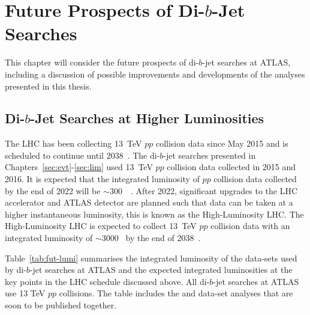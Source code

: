 \chapter{Future Prospects of Di-$b$-Jet Searches}
\label{sec:fut}

This chapter will consider the future prospects of di-$b$-jet searches at ATLAS,
including a discussion of possible improvements and developments of the analyses presented in this thesis.

\section{Di-$b$-Jet Searches at Higher Luminosities} 

The LHC has been collecting 13~TeV $pp$ collision data since May 2015 and is scheduled to continue until 2038~\cite{fut-lhc-shedule}.
The di-$b$-jet searches presented in Chapters~\ref{sec:evt}-\ref{sec:lim} used 13~TeV $pp$ collision data collected in 2015 and 2016.
It is expected that the integrated luminosity of $pp$ collision data collected by the end of 2022 will be $\sim$300~\ifb{}~\cite{fut-lhc-shedule}.
After 2022, significant upgrades to the LHC accelerator and ATLAS detector are planned such that data can be taken at a higher instantaneous luminosity,
this is known as the High-Luminosity LHC.
The High-Luminosity LHC is expected to collect 13~TeV $pp$ collision data with an integrated luminosity of $\sim$3000~\ifb{} by the end of 2038~\cite{fut-lhc-shedule}.

Table~\ref{tab:fut-lumi} summarises the integrated luminosity of the data-sets used by di-$b$-jet searches
at ATLAS and the expected integrated luminosities at the key points in the LHC schedule discussed above.
All di-$b$-jet searches at ATLAS use 13 TeV $pp$ collisions.
The table includes the \lm{} and \hm{} data-set analyses that are soon to be published together.


